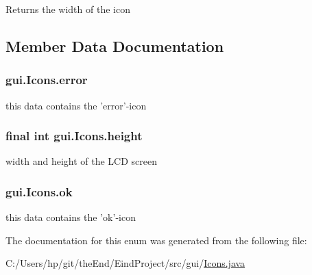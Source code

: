\begin{DoxyReturn}{Returns}
the width of the icon 
\end{DoxyReturn}


\subsection{Member Data Documentation}
\hypertarget{enumgui_1_1_icons_a0b529bf48d5bf3badfd0eba09a358624}{
\subsubsection[{error}]{\setlength{\rightskip}{0pt plus 5cm}gui.\-Icons.\-error}}\label{enumgui_1_1_icons_a0b529bf48d5bf3badfd0eba09a358624}
this data contains the 'error'-\/icon \hypertarget{enumgui_1_1_icons_ab11bc7ed7ac3f7f753226daf6ac6140f}{
\subsubsection[{height}]{\setlength{\rightskip}{0pt plus 5cm}final int gui.\-Icons.\-height}}\label{enumgui_1_1_icons_ab11bc7ed7ac3f7f753226daf6ac6140f}


width and height of the L\-C\-D screen 

\hypertarget{enumgui_1_1_icons_aceb024739dd25e6f81049f3a9eaa02e1}{
\subsubsection[{ok}]{\setlength{\rightskip}{0pt plus 5cm}gui.\-Icons.\-ok}}\label{enumgui_1_1_icons_aceb024739dd25e6f81049f3a9eaa02e1}
this data contains the 'ok'-\/icon 

The documentation for this enum was generated from the following file\-:\begin{DoxyCompactItemize}
\item 
C\-:/\-Users/hp/git/the\-End/\-Eind\-Project/src/gui/\hyperlink{_icons_8java}{Icons.\-java}\end{DoxyCompactItemize}
